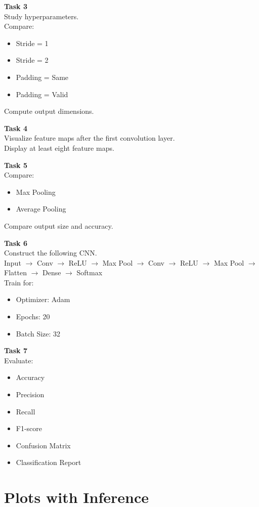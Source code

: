 \documentclass[11pt]{article}
\begin{document}
\textbf{Task 3} \\
Study hyperparameters.  \\
Compare: 
\begin{itemize}
    \item Stride = 1 
    \item Stride = 2 
    \item Padding = Same 
    \item Padding = Valid 
\end{itemize}
Compute output dimensions. 

\textbf{Task 4} \\
Visualize feature maps after the first convolution layer.  \\
Display at least eight feature maps. 

\textbf{Task 5} \\
Compare: 
\begin{itemize}
    \item Max Pooling 
    \item Average Pooling 
\end{itemize}
Compare output size and accuracy. 

\textbf{Task 6} \\
Construct the following CNN.  \\
Input $\rightarrow$ Conv $\rightarrow$ ReLU $\rightarrow$ Max Pool $\rightarrow$ Conv $\rightarrow$ ReLU $\rightarrow$ Max Pool $\rightarrow$ Flatten $\rightarrow$ Dense $\rightarrow$ Softmax  \\
Train for: 
\begin{itemize}
    \item Optimizer: Adam 
    \item Epochs: 20 
    \item Batch Size: 32 
\end{itemize}

\textbf{Task 7} \\
Evaluate: 
\begin{itemize}
    \item Accuracy 
    \item Precision 
    \item Recall 
    \item F1-score 
    \item Confusion Matrix 
    \item Classification Report 
\end{itemize}

\section{Plots with Inference}
\end{document}
